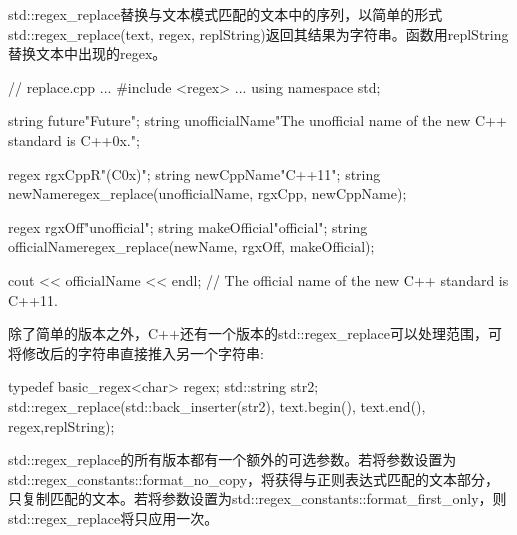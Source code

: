 
std::regex\_replace替换与文本模式匹配的文本中的序列，以简单的形式std::regex\_replace(text, regex, replString)返回其结果为字符串。函数用replString替换文本中出现的regex。


\begin{cpp}
// replace.cpp
...
#include <regex>
...
using namespace std;

string future{"Future"};
string unofficialName{"The unofficial name of the new C++ standard is C++0x."};

regex rgxCpp{R"(C\+\+0x)"};
string newCppName{"C++11"};
string newName{regex_replace(unofficialName, rgxCpp, newCppName)};

regex rgxOff{"unofficial"};
string makeOfficial{"official"};
string officialName{regex_replace(newName, rgxOff, makeOfficial)};

cout << officialName << endl;
							// The official name of the new C++ standard is C++11.
\end{cpp}

除了简单的版本之外，C++还有一个版本的std::regex\_replace可以处理范围，可将修改后的字符串直接推入另一个字符串:

\begin{cpp}
typedef basic_regex<char> regex;
std::string str2;
std::regex_replace(std::back_inserter(str2),
				   text.begin(), text.end(), regex,replString);
\end{cpp}

std::regex\_replace的所有版本都有一个额外的可选参数。若将参数设置为std::regex\_constants::format\_no\_copy，将获得与正则表达式匹配的文本部分，只复制匹配的文本。若将参数设置为std::regex\_constants::format\_first\_only，则std::regex\_replace将只应用一次。



































